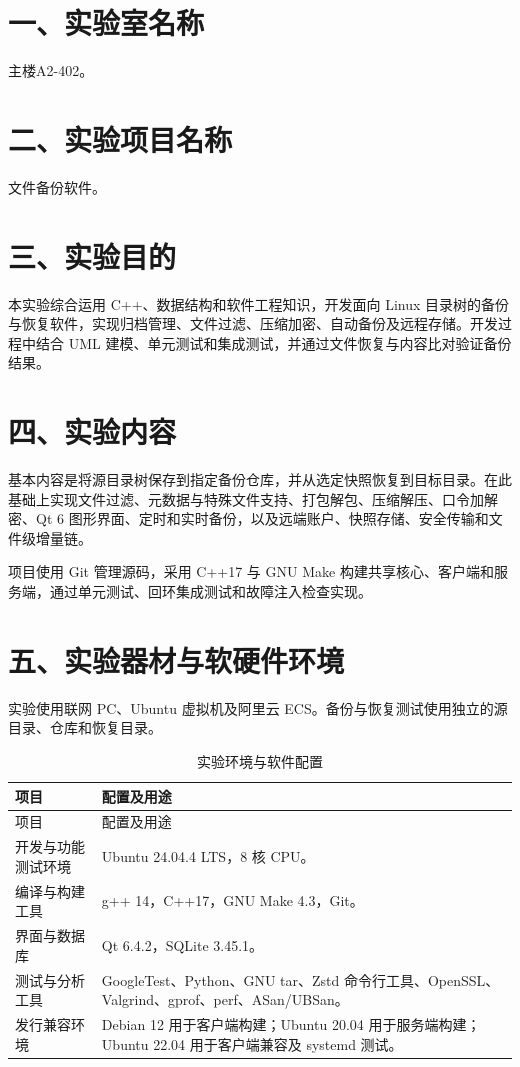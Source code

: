 \section*{一、实验室名称}
主楼A2-402。

\section*{二、实验项目名称}
文件备份软件。

\section*{三、实验目的}
本实验综合运用 C++、数据结构和软件工程知识，开发面向 Linux 目录树的备份与恢复软件，实现归档管理、文件过滤、压缩加密、自动备份及远程存储。开发过程中结合 UML 建模、单元测试和集成测试，并通过文件恢复与内容比对验证备份结果。

\section*{四、实验内容}
基本内容是将源目录树保存到指定备份仓库，并从选定快照恢复到目标目录。在此基础上实现文件过滤、元数据与特殊文件支持、打包解包、压缩解压、口令加解密、Qt 6 图形界面、定时和实时备份，以及远端账户、快照存储、安全传输和文件级增量链。

项目使用 Git 管理源码，采用 C++17 与 GNU Make 构建共享核心、客户端和服务端，通过单元测试、回环集成测试和故障注入检查实现。

\section*{五、实验器材与软硬件环境}
实验使用联网 PC、Ubuntu 虚拟机及阿里云 ECS。备份与恢复测试使用独立的源目录、仓库和恢复目录。

\begin{longtable}{L{.23\linewidth}L{.68\linewidth}}
\caption{实验环境与软件配置}\label{tab:environment}\\\toprule 项目 & 配置及用途\\\midrule\endfirsthead
\toprule 项目 & 配置及用途\\\midrule\endhead
开发与功能测试环境 & Ubuntu 24.04.4 LTS，8 核 CPU。\\
编译与构建工具 & g++ 14，C++17，GNU Make 4.3，Git。\\
界面与数据库 & Qt 6.4.2，SQLite 3.45.1。\\
测试与分析工具 & GoogleTest、Python、GNU tar、Zstd 命令行工具、OpenSSL、Valgrind、gprof、perf、ASan/UBSan。\\
发行兼容环境 & Debian 12 用于客户端构建；Ubuntu 20.04 用于服务端构建；Ubuntu 22.04 用于客户端兼容及 systemd 测试。\\
\bottomrule
\end{longtable}

